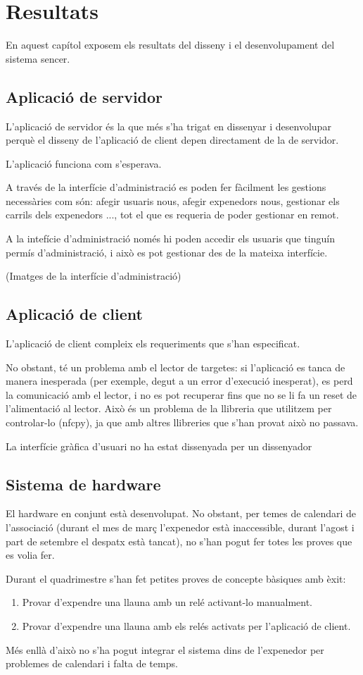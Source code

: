 \chapter{Resultats}\label{chapter:resultats}
\vspace{-0.5cm}
En aquest capítol exposem els resultats del disseny i el desenvolupament del sistema sencer.

\section{Aplicació de servidor}
L'aplicació de servidor és la que més s'ha trigat en dissenyar i desenvolupar perquè el disseny de l'aplicació de client depen directament de la de servidor.

L'aplicació funciona com s'esperava.

A través de la interfície d'administració es poden fer fàcilment les gestions necessàries com són: afegir usuaris nous, afegir expenedors nous, gestionar els carrils dels expenedors ..., tot el que es requeria de poder gestionar en remot.

A la intefície d'administració només hi poden accedir els usuaris que tinguín permís d'administració, i això es pot gestionar des de la mateixa interfície.

(Imatges de la interfície d'administració)


\section{Aplicació de client}
L'aplicació de client compleix els requeriments que s'han especificat.

No obstant, té un problema amb el lector de targetes: si l'aplicació es tanca de manera inesperada (per exemple, degut a un error d'execució inesperat), es perd la comunicació amb el lector, i no es pot recuperar fins que no se li fa un reset de l'alimentació al lector. Això és un problema de la llibreria que utilitzem per controlar-lo (nfcpy), ja que amb altres llibreries que s'han provat això no passava.

La interfície gràfica d'usuari no ha estat dissenyada per un dissenyador

\section{Sistema de hardware}
El hardware en conjunt està desenvolupat. No obstant, per temes de calendari de l'associació (durant el mes de març l'expenedor està inaccessible, durant l'agost i part de setembre el despatx està tancat), no s'han pogut fer totes les proves que es volia fer.

Durant el quadrimestre s'han fet petites proves de concepte bàsiques amb èxit:
\begin{enumerate}
\item Provar d'expendre una llauna amb un relé activant-lo manualment.
\item Provar d'expendre una llauna amb els relés activats per l'aplicació de client.
\end{enumerate}

Més enllà d'això no s'ha pogut integrar el sistema dins de l'expenedor per problemes de calendari i falta de temps.